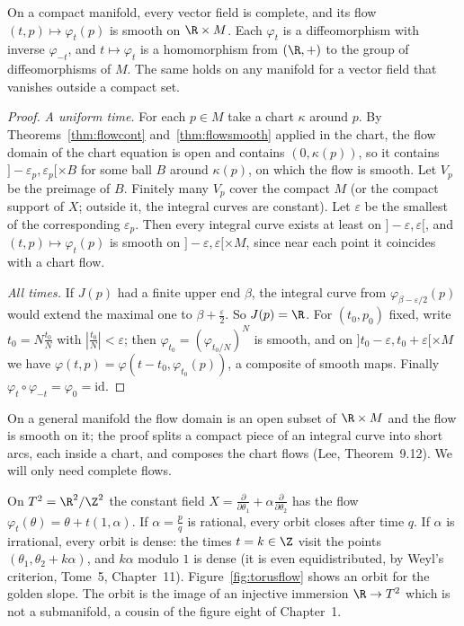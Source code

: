 \begin{theorem}\label{thm:complete}
On a compact manifold, every vector field is complete, and its flow $(t,p)\mapsto\varphi_t(p)$ is smooth on $\R\times M$. Each $\varphi_t$ is a diffeomorphism
with inverse $\varphi_{-t}$, and $t\mapsto\varphi_t$ is a homomorphism from $(\R,+)$ to the group of diffeomorphisms of $M$. The same holds on any
manifold for a vector field that vanishes outside a compact set.
\end{theorem}
\begin{proof}
\emph{A uniform time.} For each $p\in M$ take a chart $\kappa$ around $p$. By Theorems~\ref{thm:flowcont} and~\ref{thm:flowsmooth} applied in the chart, the flow
domain of the chart equation is open and contains $(0,\kappa(p))$, so it contains $]-\varepsilon_p,\varepsilon_p[\times B$ for some ball $B$ around $\kappa(p)$,
on which the flow is smooth. Let $V_p$ be the preimage of $B$. Finitely many $V_p$ cover the compact $M$ (or the compact support of $X$; outside it, the
integral curves are constant). Let $\varepsilon$ be the smallest of the corresponding $\varepsilon_p$. Then every integral curve exists at least on
$]-\varepsilon,\varepsilon[$, and $(t,p)\mapsto\varphi_t(p)$ is smooth on $]-\varepsilon,\varepsilon[\times M$, since near each point it coincides with a chart flow.

\emph{All times.} If $J(p)$ had a finite upper end $\beta$, the integral curve from $\varphi_{\beta-\varepsilon/2}(p)$ would extend the maximal one to
$\beta+\frac\varepsilon2$. So $J(p)=\R$. For $(t_0,p_0)$ fixed, write $t_0=N\frac{t_0}N$ with $|\frac{t_0}N|<\varepsilon$; then $\varphi_{t_0}=(\varphi_{t_0/N})^N$ is
smooth, and on $]t_0-\varepsilon,t_0+\varepsilon[\times M$ we have $\varphi(t,p)=\varphi(t-t_0,\varphi_{t_0}(p))$, a composite of smooth maps. Finally
$\varphi_t\circ\varphi_{-t}=\varphi_0=\mathrm{id}$.
\end{proof}

\begin{remark}
On a general manifold the flow domain is an open subset of $\R\times M$ and the flow is smooth on it; the proof splits a compact piece of an integral
curve into short arcs, each inside a chart, and composes the chart flows (Lee, Theorem~9.12). We will only need complete flows.
\end{remark}

\begin{example}\label{ex:torusflow}
On $T^2=\R^2/\Z^2$ the constant field $X=\frac\partial{\partial\theta_1}+\alpha\frac\partial{\partial\theta_2}$ has the flow
$\varphi_t(\theta)=\theta+t(1,\alpha)$. If $\alpha=\frac pq$ is rational, every orbit closes after time $q$. If $\alpha$ is irrational, every orbit is dense:
the times $t=k\in\Z$ visit the points $(\theta_1,\theta_2+k\alpha)$, and $k\alpha$ modulo $1$ is dense (it is even equidistributed, by Weyl's criterion, Tome~5, Chapter~11). Figure~\ref{fig:torusflow}
shows an orbit for the golden slope. The orbit is the image of an injective immersion $\R\to T^2$ which is not a submanifold, a cousin of the
figure eight of Chapter~1.
\end{example}

